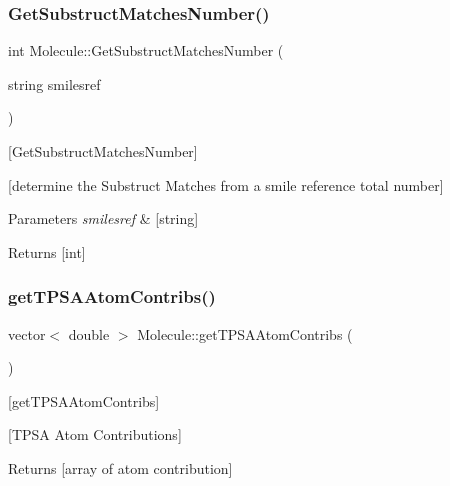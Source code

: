 \subsubsection{\texorpdfstring{Get\+Substruct\+Matches\+Number()}{GetSubstructMatchesNumber()}}
{\footnotesize\ttfamily int Molecule\+::\+Get\+Substruct\+Matches\+Number (\begin{DoxyParamCaption}\item[{string}]{smilesref }\end{DoxyParamCaption})}



\mbox{[}Get\+Substruct\+Matches\+Number\mbox{]} 

\mbox{[}determine the Substruct Matches from a smile reference total number\mbox{]}


\begin{DoxyParams}{Parameters}
{\em smilesref} & \mbox{[}string\mbox{]} \\
\hline
\end{DoxyParams}
\begin{DoxyReturn}{Returns}
\mbox{[}int\mbox{]} 
\end{DoxyReturn}
\mbox{\label{class_molecule_ab277cc8d75ec0bfafe2e40aa3d960e4b}} 
\subsubsection{\texorpdfstring{get\+T\+P\+S\+A\+Atom\+Contribs()}{getTPSAAtomContribs()}}
{\footnotesize\ttfamily vector$<$ double $>$ Molecule\+::get\+T\+P\+S\+A\+Atom\+Contribs (\begin{DoxyParamCaption}{ }\end{DoxyParamCaption})}



\mbox{[}get\+T\+P\+S\+A\+Atom\+Contribs\mbox{]} 

\mbox{[}T\+P\+SA Atom Contributions\mbox{]} \begin{DoxyReturn}{Returns}
\mbox{[}array of atom contribution\mbox{]} 
\end{DoxyReturn}
\mbox{\label{class_molecule_ab4440ddc7c396037799a37dcc6fdb497}} 
